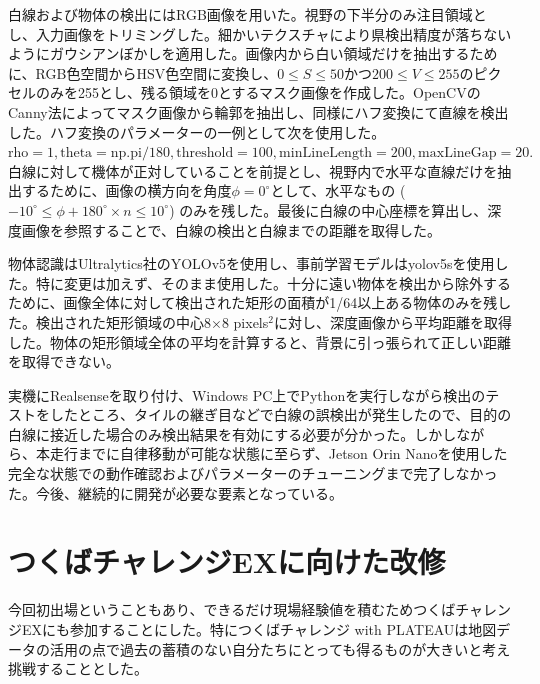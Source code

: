 \documentclass[platex,dvipdfmx]{rbproceedings}
\begin{document}
白線および物体の検出にはRGB画像を用いた。視野の下半分のみ注目領域とし、入力画像をトリミングした。細かいテクスチャにより県検出精度が落ちないようにガウシアンぼかしを適用した。画像内から白い領域だけを抽出するために、RGB色空間からHSV色空間に変換し、$0 \leq S \leq 50$かつ$200\leq V \leq 255$のピクセルのみを255とし、残る領域を0とするマスク画像を作成した。OpenCVのCanny法によってマスク画像から輪郭を抽出し、同様にハフ変換にて直線を検出した。ハフ変換のパラメーターの一例として次を使用した。$\mathrm{rho}=1, \mathrm{theta=np.pi} / 180, \mathrm{threshold}=100, \mathrm{minLineLength}=200, \mathrm{maxLineGap}=20.$ 白線に対して機体が正対していることを前提とし、視野内で水平な直線だけを抽出するために、画像の横方向を角度$\phi=0^\circ$として、水平なもの ($-10^\circ \leq \phi + 180^\circ \times n \leq 10^\circ$) のみを残した。最後に白線の中心座標を算出し、深度画像を参照することで、白線の検出と白線までの距離を取得した。

物体認識はUltralytics社のYOLOv5\cite{yolo}を使用し、事前学習モデルはyolov5sを使用した。特に変更は加えず、そのまま使用した。十分に遠い物体を検出から除外するために、画像全体に対して検出された矩形の面積が1/64以上ある物体のみを残した。検出された矩形領域の中心8$\times$8 pixels$^2$に対し、深度画像から平均距離を取得した。物体の矩形領域全体の平均を計算すると、背景に引っ張られて正しい距離を取得できない。

実機にRealsenseを取り付け、Windows PC上でPythonを実行しながら検出のテストをしたところ、タイルの継ぎ目などで白線の誤検出が発生したので、目的の白線に接近した場合のみ検出結果を有効にする必要が分かった。しかしながら、本走行までに自律移動が可能な状態に至らず、Jetson Orin Nanoを使用した完全な状態での動作確認およびパラメーターのチューニングまで完了しなかった。今後、継続的に開発が必要な要素となっている。


\section{つくばチャレンジEXに向けた改修}

今回初出場ということもあり、できるだけ現場経験値を積むためつくばチャレンジEXにも参加することにした。特につくばチャレンジ with PLATEAUは地図データの活用の点で過去の蓄積のない自分たちにとっても得るものが大きいと考え挑戦することとした。
\end{document}
